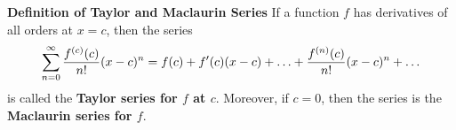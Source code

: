 \nopagenumbers
{\bf Definition of Taylor and Maclaurin Series}
\vskip 6pt
If a function $f$ has derivatives of all orders at $x=c$, then the series $$\sum_{n=0}^\infty{f^{(c)}(c)\over n!}(x-c)^n=f(c)+f'(c)(x-c)+\ldots+{f^{(n)}(c)\over n!}(x-c)^n+\ldots$$ is called the {\bf Taylor series for $f$ at $c$}. Moreover, if $c=0$, then the series is the {\bf Maclaurin series for $f$}.

\vfill\eject
